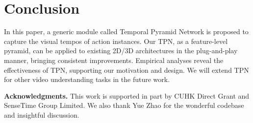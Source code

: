 \documentclass[10pt,twocolumn,letterpaper]{article}
\begin{document}
 \section{Conclusion}
\label{sec:conclu}
In this paper, a generic module called Temporal Pyramid Network is proposed to capture the visual tempos of action instances.
Our TPN, as a feature-level pyramid, can be applied to existing 2D/3D architectures in the plug-and-play manner, bringing consistent improvements.
Empirical analyses reveal the effectiveness of TPN, supporting our motivation and design. We will extend TPN for other video understanding tasks in the future work.


\noindent \textbf{Acknowledgments.} 
This work is supported in part by CUHK Direct Grant and SenseTime Group Limited. 
We also thank Yue Zhao for the wonderful codebase and insightful discussion.
 

{\small


}
\end{document}
